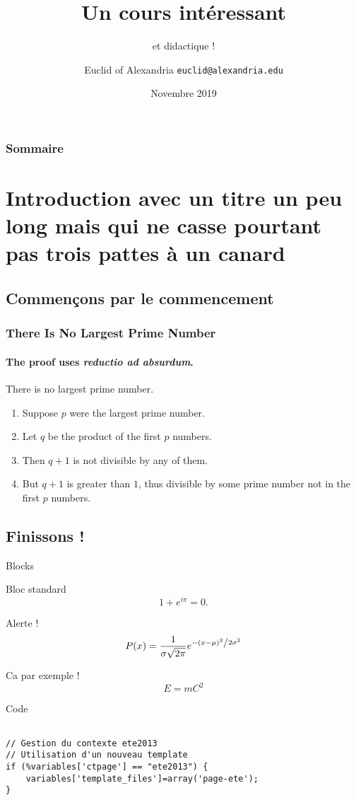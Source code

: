 \documentclass[10pt]{beamer}
\title{Un cours intéressant}
\subtitle{et didactique !}
\date[2019]{Novembre 2019}
\author[Euclid]{Euclid of Alexandria \texttt{euclid@alexandria.edu}}
\institute{Département mathématique d'Alexandrie}
\begin{document}
\begin{frame}[plain]
\titlepage
\end{frame}

\begin{frame}
        \frametitle{Sommaire}
        \tableofcontents[hideallsubsections]
\end{frame}

\section{Introduction avec un titre un peu long mais qui ne casse pourtant pas trois pattes à un canard}

\subsection{Commençons par le commencement}

\begin{frame} 
\frametitle{There Is No Largest Prime Number} 
\framesubtitle{The proof uses \textit{reductio ad absurdum}.} 
\begin{theorem}
	There is no largest prime number. \end{theorem} 
\begin{enumerate} 
	\item<1-| alert@1> Suppose $p$ were the largest prime number. 
	\item<2-> Let $q$ be the product of the first $p$ numbers. 
	\item<3-> Then $q+1$ is not divisible by any of them. 
	\item<1-> But $q + 1$ is greater than $1$, thus divisible by some prime
	number not in the first $p$ numbers.
\end{enumerate}
\end{frame}

\subsection{Finissons !}

\begin{frame}{Blocks}

\begin{block}{Bloc standard}
  $$1 + e^{i \pi} = 0.$$
\end{block}

\begin{alertblock}{Alerte !}
$$P(x) = \frac{1}{{\sigma \sqrt {2\pi } }}e^{{{ - \left( {x - \mu } \right)^2 } \mathord{\left/ {\vphantom {{ - \left( {x - \mu } \right)^2 } {2\sigma ^2 }}} \right. \kern-\nulldelimiterspace} {2\sigma ^2 }}}$$
\end{alertblock}
\begin{exampleblock}{Ca par exemple !}
  $$E = m C^2$$
\end{exampleblock}

\end{frame}

\begin{frame}[fragile]{Code}
\begin{lstlisting}

// Gestion du contexte ete2013
// Utilisation d'un nouveau template
if (%variables['ctpage'] == "ete2013") {
    variables['template_files']=array('page-ete');
}
\end{lstlisting}
\end{frame}
\end{document}
